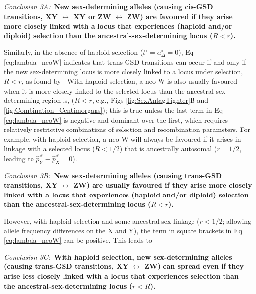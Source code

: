 \documentclass[10pt,letterpaper]{article}
\begin{document}
\vspace{0.5cm}
\noindent\textit{Conclusion 3A:}\
\textbf{New sex-determining alleles (causing cis-GSD transitions, XY $\leftrightarrow$ XY or ZW $\leftrightarrow$ ZW) are favoured if they arise more closely linked with a locus that experiences (haploid and/or diploid) selection than the ancestral-sex-determining locus ($R<r$).}
\vspace{0.5cm}

\noindent
Similarly, in the absence of haploid selection ($t^\circ=\alpha^\circ_{\Delta}=0$), Eq \eqref{eq:lambda_neoW} indicates that trans-GSD transitions can occur if and only if the new sex-determining locus is more closely linked to a locus under selection, $R<r$, as found by \cite{vanDoorn:2010hu}. 
With haploid selection, a neo-W is also usually favoured when it is more closely linked to the selected locus than the ancestral sex-determining region is, ($R<r$, e.g., Figs \ref{fig:SexAntagTighter}B and \ref{fig:Combination_Centimorgans}); this is true unless the last term in Eq \eqref{eq:lambda_neoW} is negative and dominant over the first, which requires relatively restrictive combinations of selection and recombination parameters. 
For example, with haploid selection, a neo-W will always be favoured if it arises in linkage with a selected locus ($R<1/2$) that is ancestrally autosomal ($r=1/2$, leading to $ \hat{p}^\male_Y-\hat{p}^\male_X =0$). 

\vspace{0.5cm}
\noindent\textit{Conclusion 3B:}\
\textbf{New sex-determining alleles (causing trans-GSD transitions, XY $\leftrightarrow$ ZW) are usually favoured if they arise more closely linked with a locus that experiences (haploid and/or diploid) selection than the ancestral-sex-determining locus ($R<r$).
}
\vspace{0.5cm}

\noindent
However, with haploid selection and some ancestral sex-linkage ($r<1/2$; allowing allele frequency differences on the X and Y), the term in square brackets in Eq \eqref{eq:lambda_neoW} can be positive.
This leads to 

\vspace{0.5cm}
\noindent\textit{Conclusion 3C:}\
\textbf{With haploid selection, new sex-determining alleles (causing trans-GSD transitions, XY $\leftrightarrow$ ZW) can spread even if they arise less closely linked with a locus that experiences selection than the ancestral-sex-determining locus ($r<R$).}
\vspace{0.5cm}
\end{document}
